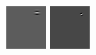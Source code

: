 \documentclass[a4paper,10pt]{article}
\begin{document}
\begin{figure}[ht]
 \includegraphics[width=\textwidth*11/100]{figures/firstgabor_Full_5.png}
 \includegraphics[width=\textwidth*11/100]{figures/firstgabor_Full_6.png}

\end{figure}
\end{document}
